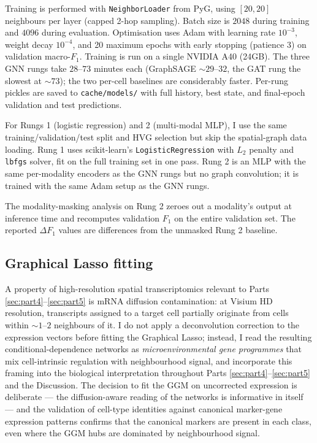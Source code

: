 Training is performed with \texttt{NeighborLoader} from PyG, using $[20, 20]$ neighbours per layer (capped 2-hop sampling). Batch size is $2048$ during training and $4096$ during evaluation. Optimisation uses Adam with learning rate $10^{-3}$, weight decay $10^{-4}$, and 20 maximum epochs with early stopping (patience 3) on validation macro-$F_1$. Training is run on a single NVIDIA A40 (24GB). The three GNN rungs take $28$--$73$ minutes each (GraphSAGE ${\sim}29$--$32$, the GAT rung the slowest at ${\sim}73$); the two per-cell baselines are considerably faster. Per-rung pickles are saved to \texttt{cache/models/} with full history, best state, and final-epoch validation and test predictions.

For Rungs 1 (logistic regression) and 2 (multi-modal MLP), I use the same training/validation/test split and HVG selection but skip the spatial-graph data loading. Rung 1 uses scikit-learn's \texttt{LogisticRegression} with $L_2$ penalty and \texttt{lbfgs} solver, fit on the full training set in one pass. Rung 2 is an MLP with the same per-modality encoders as the GNN rungs but no graph convolution; it is trained with the same Adam setup as the GNN rungs.

The modality-masking analysis on Rung 2 zeroes out a modality's output at inference time and recomputes validation $F_1$ on the entire validation set. The reported $\Delta F_1$ values are differences from the unmasked Rung 2 baseline.

\subsection*{Graphical Lasso fitting}

A property of high-resolution spatial transcriptomics relevant to Parts \ref{sec:part4}--\ref{sec:part5} is mRNA diffusion contamination: at Visium HD resolution, transcripts assigned to a target cell partially originate from cells within $\sim 1$--$2$ neighbours of it. I do not apply a deconvolution correction to the expression vectors before fitting the Graphical Lasso; instead, I read the resulting conditional-dependence networks as \emph{microenvironmental gene programmes} that mix cell-intrinsic regulation with neighbourhood signal, and incorporate this framing into the biological interpretation throughout Parts \ref{sec:part4}--\ref{sec:part5} and the Discussion. The decision to fit the GGM on uncorrected expression is deliberate --- the diffusion-aware reading of the networks is informative in itself --- and the validation of cell-type identities against canonical marker-gene expression patterns confirms that the canonical markers are present in each class, even where the GGM hubs are dominated by neighbourhood signal.

